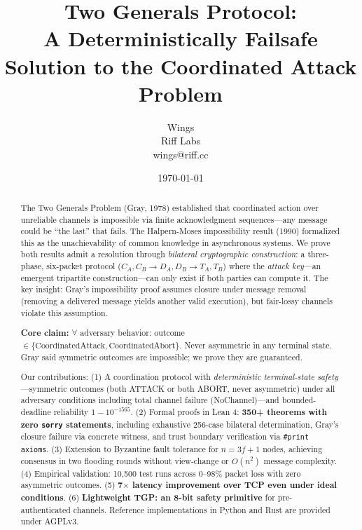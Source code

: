 \documentclass[11pt,a4paper]{article}
\title{Two Generals Protocol:\\ A Deterministically Failsafe Solution to the Coordinated Attack Problem}
\author{Wings\\Riff Labs\\wings@riff.cc}
\date{\today}
\begin{document}
\maketitle

\begin{abstract}
The Two Generals Problem (Gray, 1978) established that coordinated action over unreliable channels is impossible via finite acknowledgment sequences---any message could be ``the last'' that fails. The Halpern-Moses impossibility result (1990) formalized this as the unachievability of common knowledge in asynchronous systems. We prove both results admit a resolution through \emph{bilateral cryptographic construction}: a three-phase, six-packet protocol ($C_A, C_B \to D_A, D_B \to T_A, T_B$) where the \emph{attack key}---an emergent tripartite construction---can only exist if both parties can compute it. The key insight: Gray's impossibility proof assumes closure under message removal (removing a delivered message yields another valid execution), but fair-lossy channels violate this assumption.

\textbf{Core claim:} $\forall$ adversary behavior: outcome $\in \{\text{CoordinatedAttack}, \text{CoordinatedAbort}\}$. Never asymmetric in any terminal state. Gray said symmetric outcomes are impossible; we prove they are guaranteed.

Our contributions: (1) A coordination protocol with \emph{deterministic terminal-state safety}---symmetric outcomes (both ATTACK or both ABORT, never asymmetric) under all adversary conditions including total channel failure (NoChannel)---and bounded-deadline reliability $1-10^{-1565}$. (2) Formal proofs in Lean 4: \textbf{350+ theorems with zero \texttt{sorry} statements}, including exhaustive 256-case bilateral determination, Gray's closure failure via concrete witness, and trust boundary verification via \texttt{\#print axioms}. (3) Extension to Byzantine fault tolerance for $n = 3f + 1$ nodes, achieving consensus in two flooding rounds without view-change or $O(n^2)$ message complexity. (4) Empirical validation: 10,500 test runs across 0--98\% packet loss with zero asymmetric outcomes. (5) \textbf{7$\times$ latency improvement over TCP even under ideal conditions}. (6) \textbf{Lightweight TGP: an 8-bit safety primitive} for pre-authenticated channels. Reference implementations in Python and Rust are provided under AGPLv3.
\end{abstract}

\end{document}
